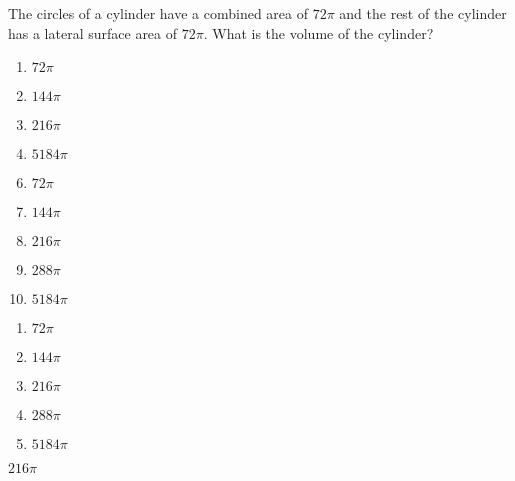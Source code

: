 The circles of a cylinder have a combined area of $72 \pi$ and the
rest of the cylinder has a lateral surface area of $72 \pi$. What
is the volume of the cylinder?


\ifsat
	\begin{enumerate}[label=\Alph*)]
		\item $72\pi$
		\item $144\pi$
		\item $216\pi$%
		\item $5184\pi$
	\end{enumerate}
\else
\fi

\ifacteven
	\begin{enumerate}[label=\textbf{\Alph*.},itemsep=\fill,align=left]
		\setcounter{enumii}{5}
		\item $72\pi$
		\item $144\pi$
		\item $216\pi$%
		\addtocounter{enumii}{1}
		\item $288\pi$
		\item $5184\pi$
	\end{enumerate}
\else
\fi

\ifactodd
	\begin{enumerate}[label=\textbf{\Alph*.},itemsep=\fill,align=left]
		\item $72\pi$
		\item $144\pi$
		\item $216\pi$%
		\item $288\pi$
		\item $5184\pi$
	\end{enumerate}
\else
\fi

\ifgridin
 $216\pi$%
		
\else
\fi

